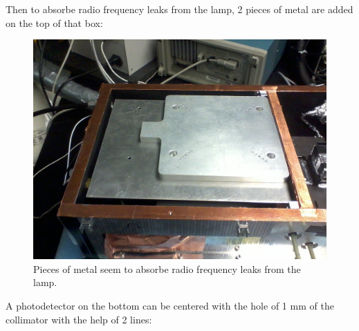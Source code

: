 \documentclass[a4paper, 11pt]{report}%
\begin{document}
  \newpage
  
  Then to absorbe radio frequency leaks from the lamp, 2 pieces of metal are added on the top of that box:
  
  \begin{figure}[!hbtp]
    \centering
    \includegraphics[totalheight=0.4\textwidth,trim=0cm 0cm 0cm 0cm, clip=true]{../Pictures/Pictures_Setup/piece_of_metal.jpg} 
    \caption{Pieces of metal seem to absorbe radio frequency leaks from the lamp.}
    \label{fig:piece_of_metal}
  \end{figure}
  
  
  A photodetector on the bottom can be centered with the hole of 1 mm of the collimator with the help of 2 lines:
\end{document}
